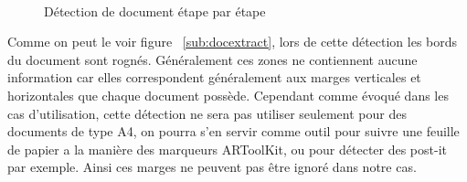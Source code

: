 \begin{figure}[H]
    \centering
      \\
\caption{Détection de document étape par étape}
\label{fig:docdetection}
\end{figure}

Comme on peut le voir figure ~\ref{sub:docextract}, lors de cette détection les bords du document sont rognés. Généralement ces zones ne contiennent aucune information car elles correspondent généralement aux marges verticales et horizontales que chaque document possède. Cependant comme évoqué dans les cas d'utilisation, cette détection ne sera pas utiliser seulement pour des documents de type A4, on pourra s'en servir comme outil pour suivre une feuille de papier a la manière des marqueurs ARToolKit, ou pour détecter des post-it par exemple. Ainsi ces marges ne peuvent pas être ignoré dans notre cas.

